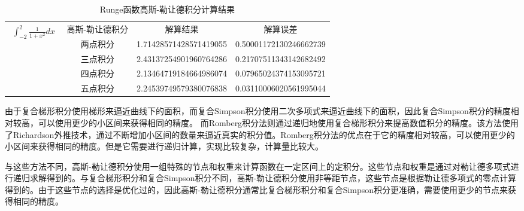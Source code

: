 \documentclass[12pt, onecolumn]{article}
\newcommand\normf{\fangsong}
\begin{document}
	\begin{table}[]
	\caption{\normf Runge函数高斯-勒让德积分计算结果}
	\label{tab:Runge函数高斯-勒让德积分结果}
	\centering
	\vspace{2mm}
	\normf
\begin{tabular}{l|c|cc}
\toprule
\multirow{5}{*}{$\begin{aligned}
\int_{-2}^{2}\frac{1}{1+x^2}dx
\end{aligned}$} & 高斯-勒让德积分 & 解算结果                   & 解算误差                   \\ \cmidrule{2-4} 
              & 两点积分     & 1.71428571428571419055 & 0.50001172130246662739 \\
              & 三点积分     & 2.43137254901960764286 & 0.21707511343142682492 \\
              & 四点积分     & 2.13464719184664986074 & 0.07965024374153095721 \\
              & 五点积分     & 2.24539749579380076838 & 0.03110006020561995044 \\ \bottomrule
\end{tabular}
	\end{table}
	
	由于复合梯形积分使用梯形来逼近曲线下的面积，而复合Simpson积分使用二次多项式来逼近曲线下的面积，因此复合Simpson积分的精度相对较高，可以使用更少的小区间来获得相同的精度。
	而Romberg积分法则通过递归地使用复合梯形积分来提高数值积分的精度。该方法使用了Richardson外推技术，通过不断增加小区间的数量来逼近真实的积分值。Romberg积分法的优点在于它的精度相对较高，可以使用更少的小区间来获得相同的精度。但是它需要进行递归计算，实现比较复杂，计算量比较大。
	
	与这些方法不同，高斯-勒让德积分使用一组特殊的节点和权重来计算函数在一定区间上的定积分。这些节点和权重是通过对勒让德多项式进行递归求解得到的。与复合梯形积分和复合Simpson积分不同，高斯-勒让德积分使用非等距节点，这些节点是根据勒让德多项式的零点计算得到的。由于这些节点的选择是优化过的，因此高斯-勒让德积分通常比复合梯形积分和复合Simpson积分更准确，需要使用更少的节点来获得相同的精度。
	
	
	
	
	
	
	
	
	
	
\end{document}
